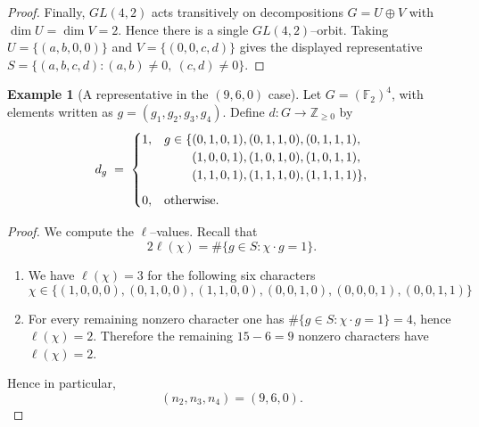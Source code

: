 \documentclass[12pt,twoside,]{amsart}
\theoremstyle{plain}
\theoremstyle{definition}
\newtheorem{example}[theorem]{Example}
\begin{document}
\begin{proof}
Finally, $GL(4,2)$ acts transitively on decompositions $G=U\oplus V$ with $\dim U=\dim V=2$.  Hence there is a single $GL(4,2)$--orbit.
Taking $U=\{(a,b,0,0)\}$ and $V=\{(0,0,c,d)\}$ gives the displayed representative
\(
S=\{(a,b,c,d): (a,b)\ne 0,\ (c,d)\ne 0\}.
\)
\end{proof}

\begin{example}[A representative in the $(9,6,0)$ case]
Let $G=(\mathbb F_2)^4$, with elements written as $g=(g_1,g_2,g_3,g_4)$.
Define $d:G\to\mathbb Z_{\ge0}$ by
\[
d_g \;=\;
\begin{cases}
1, & g\in\{(0,1,0,1),(0,1,1,0),(0,1,1,1),\\
   & \hphantom{g\in\{} (1,0,0,1),(1,0,1,0),(1,0,1,1),\\
   & \hphantom{g\in\{} (1,1,0,1),(1,1,1,0),(1,1,1,1)\},\\[6pt]
0, & \text{otherwise.}
\end{cases}
\]
\end{example}


\begin{proof}
We compute the $\ell$–values. Recall that
\[
2\ell(\chi)=\#\{g\in S:\chi\cdot g=1\}.
\]


\begin{enumerate}

\item We have $\ell(\chi)=3$ for the following six characters
 $$\chi\in\{(1,0,0,0),(0,1,0,0),(1,1,0,0),(0,0,1,0),(0,0,0,1),(0,0,1,1)\}$$ 


 \item For every remaining nonzero character  one has $\#\{g\in S:\chi\cdot g=1\}=4$, hence $\ell(\chi)=2$.
Therefore the remaining $15-6=9$ nonzero characters have $\ell(\chi)=2$.


\end{enumerate}

Hence in particular, \[
(n_2,n_3,n_4)=(9,6,0).
\]
\end{proof}
\end{document}
